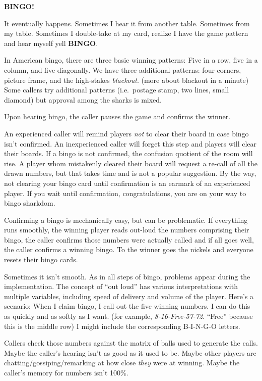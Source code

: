 \documentclass[
  letterpaper,
  DIV=11,
  numbers=noendperiod]{scrartcl}
\begin{document}
\textbf{BINGO!}

It eventually happens. Sometimes I hear it from another table. Sometimes
from my table. Sometimes I double-take at my card, realize I have the
game pattern and hear myself yell \textbf{BINGO}.

In American bingo, there are three basic winning patterns: Five in a
row, five in a column, and five diagonally. We have three additional
patterns: four corners, picture frame, and the high-stakes
\emph{blackout}. (more about blackout in a minute) Some callers try
additional patterns (i.e.~postage stamp, two lines, small diamond) but
approval among the sharks is mixed.

Upon hearing bingo, the caller pauses the game and confirms the winner.

An experienced caller will remind players \emph{not} to clear their
board in case bingo isn't confirmed. An inexperienced caller will forget
this step and players will clear their boards. If a bingo is not
confirmed, the confusion quotient of the room will rise. A player whom
mistakenly cleared their board will request a re-call of all the drawn
numbers, but that takes time and is not a popular suggestion. By the
way, not clearing your bingo card until confirmation is an earmark of an
experienced player. If you wait until confirmation, congratulations, you
are on your way to bingo sharkdom.

Confirming a bingo is mechanically easy, but can be problematic. If
everything runs smoothly, the winning player reads out-loud the numbers
comprising their bingo, the caller confirms those numbers were actually
called and if all goes well, the caller confirms a winning bingo. To the
winner goes the nickels and everyone resets their bingo cards.

Sometimes it isn't smooth. As in all steps of bingo, problems appear
during the implementation. The concept of ``out loud'' has various
interpretations with multiple variables, including speed of delivery and
volume of the player. Here's a scenario: When I claim bingo, I call out
the five winning numbers. I can do this as quickly and as softly as I
want. (for example, \emph{8-16-Free-57-72}. ``Free'' because this is the
middle row) I might include the corresponding B-I-N-G-O letters.

Callers check those numbers against the matrix of balls used to generate
the calls. Maybe the caller's hearing isn't as good as it used to be.
Maybe other players are chatting/gossiping/remarking at how close
\emph{they} were at winning. Maybe the caller's memory for numbers isn't
100\%.
\end{document}
